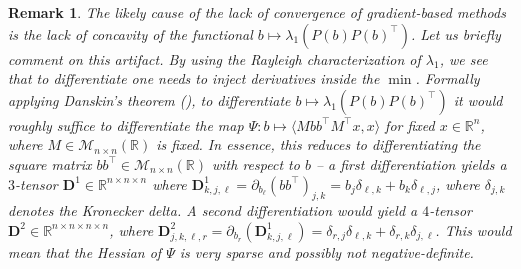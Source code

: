 \documentclass[journal,twoside,web]{ieeecolor}
\newcommand{\del}{\partial}
\newcommand{\R}{\mathbb{R}}
\newtheorem{remark}{Remark}
\def\*#1{\mathbf{#1}}
\begin{document}
	
	\begin{remark}  The likely cause of the lack of convergence of gradient-based methods is the lack of concavity of the functional $b\mapsto\lambda_1\left(P(b)P(b)^\top\right)$. Let us briefly comment on this artifact.  By using the Rayleigh characterization of $\lambda_1$, we see that to differentiate one needs to inject derivatives inside the $\min$. Formally applying Danskin's theorem (\cite{danskin1966theory}), to differentiate $b\mapsto\lambda_1\left(P(b)P(b)^\top\right)$ it would roughly suffice to differentiate the map $\Psi: b\mapsto \langle Mbb^\top M^\top x, x\rangle$ for fixed $x\in\R^n$, where $M\in\mathcal{M}_{n\times n}(\R)$ is fixed. In essence, this reduces to differentiating the square matrix $bb^\top\in\mathcal{M}_{n\times n}(\R)$ with respect to $b$ -- a first differentiation yields a $3$-tensor $\*D^1\in\R^{n\times n\times n}$ where $\*D^1_{k, j, \ell} = \del_{b_\ell} (bb^\top)_{j, k} = b_j\delta_{\ell,k}+b_k\delta_{\ell,j}$, where $\delta_{j,k}$ denotes the Kronecker delta. A second differentiation would yield a $4$-tensor $\*D^2\in\R^{n\times n \times n \times n}$, where $\*D^2_{j,k,\ell,r} = \del_{b_r}\left(\*D^1_{k, j, \ell} \right) = \delta_{r,j}\delta_{\ell,k} + \delta_{r,k}\delta_{j,\ell}$. This would mean that the Hessian of $\Psi$ is very sparse and possibly not negative-definite.
	\end{remark}
	\medskip
	
\end{document}
